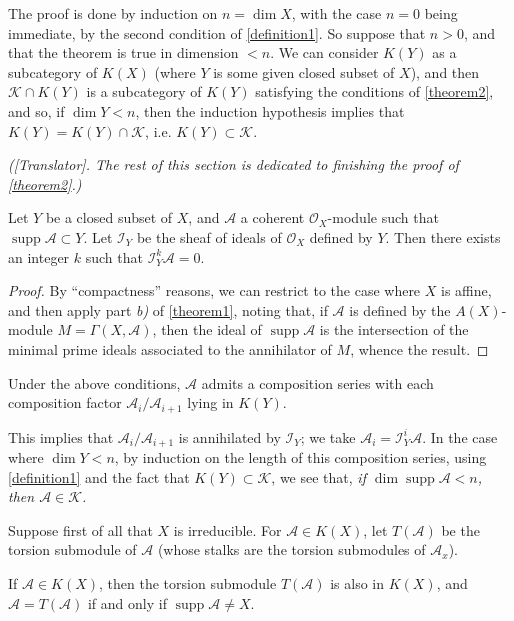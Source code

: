 \documentclass{article}
\theoremstyle{plain}
\newenvironment{lemma}[1]
  {\renewcommand\theinnercustomlemma{#1}\innercustomlemma}
  {\endinnercustomlemma}
\newenvironment{corollary}[1]
  {\renewcommand\theinnercustomcorollary{#1}\innercustomcorollary}
  {\endinnercustomcorollary}
\theoremstyle{definition}
\newcommand{\sh}{\mathscr}
\newcommand{\cat}{\mathcal}
\newcommand{\supp}{\operatorname{supp}}
\newcommand{\oldpage}[1]{\marginpar{\footnotesize$\Big\vert$ \textit{p.~#1}}}
\begin{document}
The proof is done by induction on $n=\dim X$, with the case $n=0$ being immediate, by the second condition of \cref{definition1}.
So suppose that $n>0$, and that the theorem is true in dimension $<n$.
We can consider $K(Y)$ as a subcategory of $K(X)$ (where $Y$ is some given closed subset of $X$), and then $\cat{K}\cap K(Y)$ is a subcategory of $K(Y)$ satisfying the conditions of \cref{theorem2}, and so, if $\dim Y<n$, then the induction hypothesis implies that $K(Y)=K(Y)\cap\cat{K}$, i.e. $K(Y)\subset\cat{K}$.

\medskip\noindent\emph{([Translator]. The rest of this section is dedicated to finishing the proof of \cref{theorem2}.)}

\begin{lemma}{1}
\label{lemma1}
  Let $Y$ be a closed subset of $X$, and $\sh{A}$ a coherent $\sh{O}_X$-module such that $\supp\sh{A}\subset Y$.
  Let $\sh{I}_Y$ be the sheaf of ideals of $\sh{O}_X$ defined by $Y$.
  Then there exists an integer $k$ such that $\sh{I}_Y^k\sh{A}=0$.
\end{lemma}

\begin{proof}
  By ``compactness'' reasons, we can restrict to the case where $X$ is affine, and then apply part \emph{b)} of \cref{theorem1}, noting that, if $\sh{A}$ is defined by the $A(X)$-module $M=\Gamma(X,\sh{A})$, then the ideal of $\supp\sh{A}$ is the intersection of the minimal prime ideals associated to the annihilator of $M$, whence the result.
\end{proof}

\begin{corollary}{1}
\label{corollary-1}
  Under the above conditions, $\sh{A}$ admits a composition series with each composition factor $\sh{A}_i/\sh{A}_{i+1}$ lying in $K(Y)$.
\end{corollary}

This implies that $\sh{A}_i/\sh{A}_{i+1}$ is annihilated by $\sh{I}_Y$;
we take $\sh{A}_i=\sh{I}_Y^i\sh{A}$.
In the case where $\dim Y<n$, by induction on the length of
\oldpage{2-03}
this composition series, using \cref{definition1} and the fact that $K(Y)\subset\cat{K}$, we see that, \emph{if $\dim\supp\sh{A}<n$, then $\sh{A}\in\cat{K}$.}

Suppose first of all that $X$ is irreducible.
For $\sh{A}\in K(X)$, let $T(\sh{A})$ be the torsion submodule of $\sh{A}$ (whose stalks are the torsion submodules of $\sh{A}_x$).

\begin{lemma}{2}
\label{lemma2}
  If $\sh{A}\in K(X)$, then the torsion submodule $T(\sh{A})$ is also in $K(X)$, and $\sh{A}=T(\sh{A})$ if and only if $\supp\sh{A}\neq X$.
\end{lemma}
\end{document}
